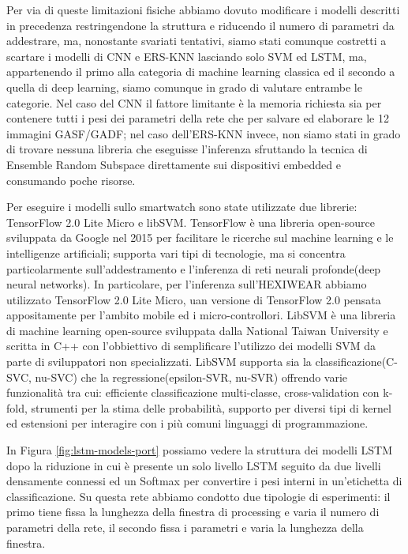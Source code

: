 Per via di queste limitazioni fisiche abbiamo dovuto modificare i modelli descritti in precedenza restringendone la struttura e riducendo il numero di parametri da addestrare, ma, nonostante svariati tentativi, siamo stati comunque costretti a scartare i modelli di CNN e ERS-KNN lasciando solo SVM ed LSTM, ma, appartenendo il primo alla categoria di machine learning classica ed il secondo a quella di deep learning, siamo comunque in grado di valutare entrambe le categorie. Nel caso del CNN il fattore limitante è la memoria richiesta sia per contenere tutti i pesi dei parametri della rete che per salvare ed elaborare le 12 immagini GASF/GADF; nel caso dell'ERS-KNN invece, non siamo stati in grado di trovare nessuna libreria che eseguisse l'inferenza sfruttando la tecnica di Ensemble Random Subspace direttamente sui dispositivi embedded e consumando poche risorse.

Per eseguire i modelli sullo smartwatch sono state utilizzate due librerie: TensorFlow 2.0 Lite Micro e libSVM.
TensorFlow è una libreria open-source sviluppata da Google nel 2015 per facilitare le ricerche sul machine learning e le intelligenze artificiali; supporta vari tipi di tecnologie, ma si concentra particolarmente sull'addestramento e l'inferenza di reti neurali profonde(deep neural networks)\cite{abadi2016tensorflow}. In particolare, per l'inferenza sull'HEXIWEAR abbiamo utilizzato TensorFlow 2.0 Lite Micro, uan versione di TensorFlow 2.0 pensata appositamente per l'ambito mobile ed i micro-controllori. 
LibSVM\cite{chang2011libsvm} è una libreria di machine learning open-source sviluppata dalla National Taiwan University e scritta in C++ con l'obbiettivo di semplificare l'utilizzo dei modelli SVM da parte di sviluppatori non specializzati. LibSVM supporta sia la classificazione(C-SVC, nu-SVC) che la regressione(epsilon-SVR, nu-SVR) offrendo varie funzionalità tra cui: efficiente classificazione multi-classe, cross-validation con k-fold, strumenti per la stima delle probabilità, supporto per diversi tipi di kernel ed estensioni per interagire con i più comuni linguaggi di programmazione.

In Figura \ref{fig:lstm-models-port} possiamo vedere la struttura dei modelli LSTM dopo la riduzione in cui è presente un solo livello LSTM seguito da due livelli densamente connessi ed un Softmax per convertire i pesi interni in un'etichetta di classificazione. Su questa rete abbiamo condotto due tipologie di esperimenti: il primo tiene fissa la lunghezza della finestra di processing e varia il numero di parametri della rete, il secondo fissa i parametri e varia la lunghezza della finestra.

